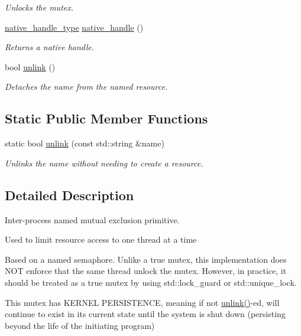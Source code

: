 \begin{DoxyCompactItemize}
\begin{DoxyCompactList}\small\item\em Unlocks the mutex. \end{DoxyCompactList}\item 
\hyperlink{classcpen333_1_1process_1_1posix_1_1mutex_aac6d3675fcffc52ddf281e952968e44b}{native\+\_\+handle\+\_\+type} \hyperlink{classcpen333_1_1process_1_1posix_1_1mutex_aa36462cbd2181e20caa35656c619c6dd}{native\+\_\+handle} ()
\begin{DoxyCompactList}\small\item\em Returns a native handle. \end{DoxyCompactList}\item 
bool \hyperlink{classcpen333_1_1process_1_1posix_1_1mutex_ac1bcf9576d7470e5d64e17876c9cdb36}{unlink} ()
\begin{DoxyCompactList}\small\item\em Detaches the name from the named resource. \end{DoxyCompactList}\end{DoxyCompactItemize}
\subsection*{Static Public Member Functions}
\begin{DoxyCompactItemize}
\item 
static bool \hyperlink{classcpen333_1_1process_1_1posix_1_1mutex_ae5750c148e0408daac498a87d2d9a579}{unlink} (const std\+::string \&name)
\begin{DoxyCompactList}\small\item\em Unlinks the name without needing to create a resource. \end{DoxyCompactList}\end{DoxyCompactItemize}


\subsection{Detailed Description}
Inter-\/process named mutual exclusion primitive. 

Used to limit resource access to one thread at a time

Based on a named semaphore. Unlike a true mutex, this implementation does N\+OT enforce that the same thread unlock the mutex. However, in practice, it should be treated as a true mutex by using std\+::lock\+\_\+guard or std\+::unique\+\_\+lock.

This mutex has K\+E\+R\+N\+EL P\+E\+R\+S\+I\+S\+T\+E\+N\+CE, meaning if not \hyperlink{classcpen333_1_1process_1_1posix_1_1mutex_ac1bcf9576d7470e5d64e17876c9cdb36}{unlink()}-\/ed, will continue to exist in its current state until the system is shut down (persisting beyond the life of the initiating program) 

